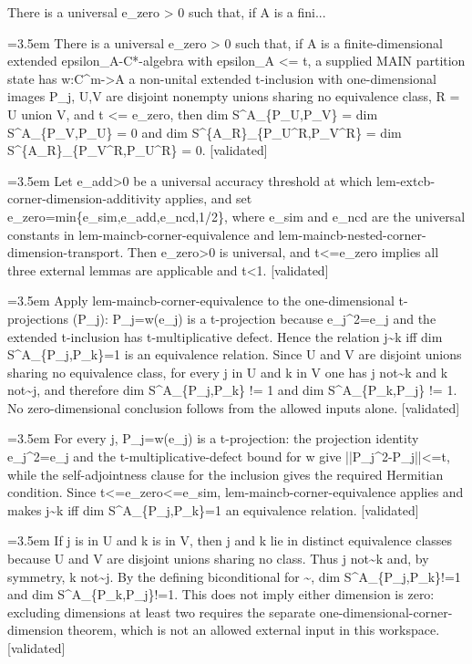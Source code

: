 \documentclass{article}
\newcommand{\step}[1]{\par\noindent\hangindent=3.5em\hangafter=1%
  \makebox[3.5em][l]{\textbf{#1.}}}
\newcommand{\steptag}[1]{\hfill{\small\textsf{[#1]}}}
\begin{document}
\begin{proofbox}{There is a universal e\_zero > 0 such that, if A is a fini...}
\step{1} There is a universal e\_zero > 0 such that, if A is a finite-dimensional extended epsilon\_A-C*-algebra with epsilon\_A <= t, a supplied MAIN partition state has w:C\textasciicircum{}m->A a non-unital extended t-inclusion with one-dimensional images P\_j, U,V are disjoint nonempty unions sharing no equivalence class, R = U union V, and t <= e\_zero, then dim S\textasciicircum{}A\_\{P\_U,P\_V\} = dim S\textasciicircum{}A\_\{P\_V,P\_U\} = 0 and dim S\textasciicircum{}\{A\_R\}\_\{P\_U\textasciicircum{}R,P\_V\textasciicircum{}R\} = dim S\textasciicircum{}\{A\_R\}\_\{P\_V\textasciicircum{}R,P\_U\textasciicircum{}R\} = 0. \steptag{validated} \\[6pt]
\step{1.1} Let e\_add>0 be a universal accuracy threshold at which lem-extcb-corner-dimension-additivity applies, and set e\_zero=min\{e\_sim,e\_add,e\_ncd,1/2\}, where e\_sim and e\_ncd are the universal constants in lem-maincb-corner-equivalence and lem-maincb-nested-corner-dimension-transport. Then e\_zero>0 is universal, and t<=e\_zero implies all three external lemmas are applicable and t<1. \steptag{validated} \\[4pt]
\step{1.2} Apply lem-maincb-corner-equivalence to the one-dimensional t-projections (P\_j): P\_j=w(e\_j) is a t-projection because e\_j\textasciicircum{}2=e\_j and the extended t-inclusion has t-multiplicative defect. Hence the relation j\textasciitilde{}k iff dim S\textasciicircum{}A\_\{P\_j,P\_k\}=1 is an equivalence relation. Since U and V are disjoint unions sharing no equivalence class, for every j in U and k in V one has j not\textasciitilde{}k and k not\textasciitilde{}j, and therefore dim S\textasciicircum{}A\_\{P\_j,P\_k\} != 1 and dim S\textasciicircum{}A\_\{P\_k,P\_j\} != 1. No zero-dimensional conclusion follows from the allowed inputs alone. \steptag{validated} \\[6pt]
\step{1.2.1} For every j, P\_j=w(e\_j) is a t-projection: the projection identity e\_j\textasciicircum{}2=e\_j and the t-multiplicative-defect bound for w give ||P\_j\textasciicircum{}2-P\_j||<=t, while the self-adjointness clause for the inclusion gives the required Hermitian condition. Since t<=e\_zero<=e\_sim, lem-maincb-corner-equivalence applies and makes j\textasciitilde{}k iff dim S\textasciicircum{}A\_\{P\_j,P\_k\}=1 an equivalence relation. \steptag{validated} \\[4pt]
\step{1.2.2} If j is in U and k is in V, then j and k lie in distinct equivalence classes because U and V are disjoint unions sharing no class. Thus j not\textasciitilde{}k and, by symmetry, k not\textasciitilde{}j. By the defining biconditional for \textasciitilde{}, dim S\textasciicircum{}A\_\{P\_j,P\_k\}!=1 and dim S\textasciicircum{}A\_\{P\_k,P\_j\}!=1. This does not imply either dimension is zero: excluding dimensions at least two requires the separate one-dimensional-corner-dimension theorem, which is not an allowed external input in this workspace. \steptag{validated} \\[4pt]

\end{proofbox}
\end{document}
